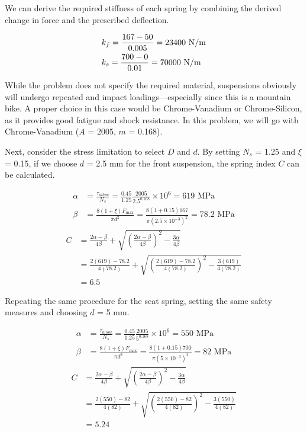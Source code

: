 \documentclass[a4paper,openany,12pt]{book}
\begin{document}
{{We can derive the required stiffness of each spring by combining the
derived change in force and the prescribed deflection.

$$\begin{gathered}
      k_f = \frac{167 - 50}{0.005} = 23400 \text{ N/m} \hfill \\
      k_s = \frac{700 - 0}{0.01} = 70000 \text{ N/m} \hfill \\ 
    \end{gathered}$$

While the problem does not specify the required material, suspensions
obviously will undergo repeated and impact loadings---especially since
this is a mountain bike. A proper choice in this case would be
Chrome-Vanadium or Chrome-Silicon, as it provides good fatigue and shock
resistance. In this problem, we will go with Chrome-Vanadium (\(A\) =
2005, \(m\) = 0.168).

Next, consider the stress limitation to select \(D\) and \(d\). By setting
\(N_s\) = 1.25 and \(\xi\) = 0.15, if we choose \(d\) = 2.5 mm for the front
suspension, the spring index \(C\) can be calculated.

$$\begin{aligned}
    \alpha  &= \frac{\tau _{allow}}{N_s} = \frac{0.45}{1.25}\frac{2005}{2.5^{0.168}} \times 10^6 = 619 \text{ MPa} \\ 
    \beta  &= \frac{8(1 + \xi )F_{\max}}{\pi d^2} = \frac{8(1 + 0.15)167}{\pi (2.5 \times 10^{-3})^2} = 78.2 \text{ MPa}
  \end{aligned}$$ $$\begin{aligned}
    C &= \frac{2\alpha  - \beta}{4\beta} + \sqrt {\left( \frac{2\alpha  - \beta}{4\beta} \right)^2 - \frac{3\alpha}{4\beta}}  \\ 
      & = \frac{2(619) - 78.2}{4(78.2)} + \sqrt {\left( \frac{2(619) - 78.2}{4(78.2)} \right)^2 - \frac{3(619)}{4(78.2)}}  \\ 
      &= 6.5 
  \end{aligned}$$

Repeating the same procedure for the seat spring, setting the same
safety measures and choosing \(d\) = 5 mm.

$$\begin{aligned}
    \alpha &= \frac{\tau_{allow}}{N_s} = \frac{0.45}{1.25}\frac{2005}{5^{0.168}} \times 10^6 = 550\text{ MPa} \\ 
    \beta &= \frac{8(1 + \xi )F_{\max}}{\pi d^2} = \frac{8(1 + 0.15)700}{\pi (5 \times 10^{-3})^2} = 82\text{ MPa}
  \end{aligned}$$ $$\begin{aligned}
    C &= \frac{2\alpha  - \beta}{4\beta} + \sqrt {\left( \frac{2\alpha  - \beta}{4\beta} \right)^2 - \frac{3\alpha}{4\beta}}  \\ 
      &= \frac{2(550) - 82}{4(82)} + \sqrt {\left( \frac{2(550) - 82}{4(82)} \right)^2 - \frac{3(550)}{4(82)}}  \\ 
      &= 5.24
  \end{aligned}$$

}}
\end{document}
